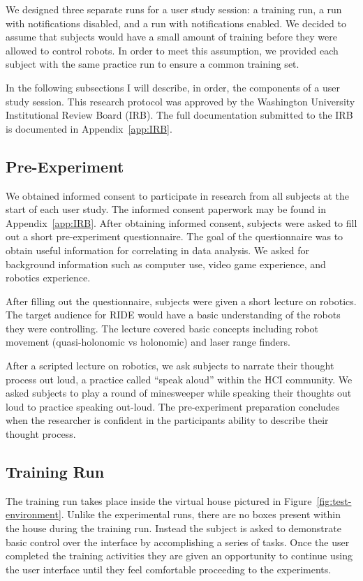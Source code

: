 We designed three separate runs for a user study session: a training run, a run with notifications disabled, and a run with notifications enabled. We decided to assume that subjects would have a small amount of training before they were allowed to control robots. In order to meet this assumption, we provided each subject with the same practice run to ensure a common training set.

In the following subsections I will describe, in order, the components of a user study session. This research protocol was approved by the Washington University Institutional Review Board (IRB). The full documentation submitted to the IRB is documented in Appendix~\ref{app:IRB}.

\subsection{Pre-Experiment} %
\label{sub:pre_experiment}
We obtained informed consent to participate in research from all subjects at the start of each user study. The informed consent paperwork may be found in Appendix~\ref{app:IRB}. After obtaining informed consent, subjects were asked to fill out a short pre-experiment questionnaire. The goal of the questionnaire was to obtain useful information for correlating in data analysis. We asked for background information such as computer use, video game experience, and robotics experience.

After filling out the questionnaire, subjects were given a short lecture on robotics. The target audience for RIDE would have a basic understanding of the robots they were controlling. The lecture covered basic concepts including robot movement (quasi-holonomic  vs holonomic) and laser range finders.

After a scripted lecture on robotics, we ask subjects to narrate their thought process out loud, a practice called ``speak aloud'' within the HCI community. We asked subjects to play a round of minesweeper while speaking their thoughts out loud to practice speaking out-loud. The pre-experiment preparation concludes when the researcher is confident in the participants ability to describe their thought process.

\subsection{Training Run} %
\label{sub:training_run}
The training run takes place inside the virtual house pictured in Figure~\ref{fig:test-environment}. Unlike the experimental runs, there are no boxes present within the house during the training run. Instead the subject is asked to demonstrate basic control over the interface by accomplishing a series of tasks. Once the user completed the training activities they are given an opportunity to continue using the user interface until they feel comfortable proceeding to the experiments.

